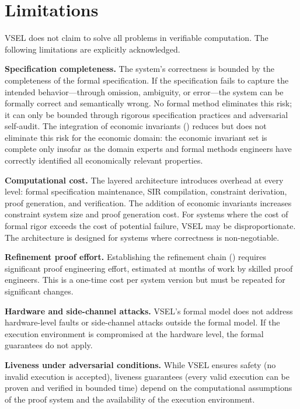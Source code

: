 \documentclass[11pt,a4paper]{article}
\theoremstyle{definition}
\begin{document}
\section{Limitations}
\label{sec:limitations}

VSEL does not claim to solve all problems in verifiable computation. The following limitations are explicitly acknowledged.

\noindent\textbf{Specification completeness.} The system's correctness is bounded by the completeness of the formal specification. If the specification fails to capture the intended behavior---through omission, ambiguity, or error---the system can be formally correct and semantically wrong. No formal method eliminates this risk; it can only be bounded through rigorous specification practices and adversarial self-audit. The integration of economic invariants () reduces but does not eliminate this risk for the economic domain: the economic invariant set is complete only insofar as the domain experts and formal methods engineers have correctly identified all economically relevant properties.

\noindent\textbf{Computational cost.} The layered architecture introduces overhead at every level: formal specification maintenance, SIR compilation, constraint derivation, proof generation, and verification. The addition of economic invariants increases constraint system size and proof generation cost. For systems where the cost of formal rigor exceeds the cost of potential failure, VSEL may be disproportionate. The architecture is designed for systems where correctness is non-negotiable.

\noindent\textbf{Refinement proof effort.} Establishing the refinement chain () requires significant proof engineering effort, estimated at months of work by skilled proof engineers. This is a one-time cost per system version but must be repeated for significant changes.

\noindent\textbf{Hardware and side-channel attacks.} VSEL's formal model does not address hardware-level faults or side-channel attacks outside the formal model. If the execution environment is compromised at the hardware level, the formal guarantees do not apply.

\noindent\textbf{Liveness under adversarial conditions.} While VSEL ensures safety (no invalid execution is accepted), liveness guarantees (every valid execution can be proven and verified in bounded time) depend on the computational assumptions of the proof system and the availability of the execution environment.
\end{document}
